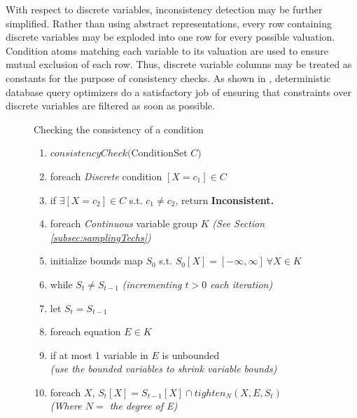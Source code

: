 With  respect to discrete variables, inconsistency detection may be further simplified.  Rather than using abstract representations, every row containing discrete variables may be exploded into one row for every possible valuation.  Condition atoms matching each variable to its valuation are used to ensure mutual exclusion of each row.  Thus, discrete variable columns may be treated as constants for the purpose of consistency checks.  As shown in \cite{AJKO2008}, deterministic database query optimizers do a satisfactory job of ensuring that constraints over discrete variables are filtered as soon as possible.

\begin{figure}
\begin{algorithm} Checking the consistency of a condition
\label{alg:consistCheck}
\footnotesize
\begin{enumerate}
\item $consistencyCheck($ConditionSet $C)$
\item \hspace*{0.1in} foreach \textit{Discrete} condition $[X = c_1] \in C$
\item \hspace*{0.2in} if $\exists [X = c_2] \in C$ s.t. $c_1 \neq c_2$, return \textbf{Inconsistent.}
\item \hspace*{0.1in} foreach \textit{Continuous} variable group $K$ \textit{(See Section \ref{subsec:samplingTechs})}
\item \hspace*{0.2in} initialize bounds map $S_0$ s.t. $S_0[X] = [-\infty,\infty]\ \forall X \in K$
\item \hspace*{0.2in} while $S_{t} \neq S_{t-1}$ \textit{(incrementing $t>0$ each iteration)}
\item \hspace*{0.3in} let $S_{t} = S_{t-1}$
\item \hspace*{0.3in} foreach equation $E \in K$
\item \hspace*{0.4in} if at most 1 variable in $E$ is unbounded
\\    \hspace*{0.5in} \textit{(use the bounded variables to shrink variable bounds)}
\item \hspace*{0.5in} foreach $X$, $S_{t}[X] = S_{t-1}[X] \cap tighten_N(X,E,S_{t})$\\ \hspace*{0.7in} \textit{(Where $N = $ the degree of E)}

\end{enumerate}
\end{algorithm}
\end{figure}
